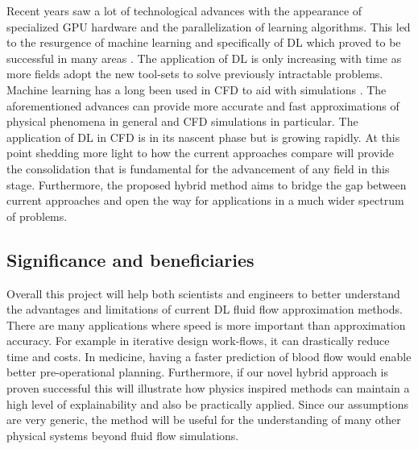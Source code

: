 \documentclass[a4paper,11pt]{article}
\begin{document}
 Recent years saw a lot of technological advances with the appearance of specialized GPU hardware and the parallelization of learning algorithms. This led to the resurgence of machine learning and specifically of DL which proved to be successful in many areas \cite{lecun2015deep}. The application of DL is only increasing with time as more fields adopt the new tool-sets to solve previously intractable problems. Machine learning has a long been used in CFD to aid with simulations \cite{ferziger2012computationalcfd}. The aforementioned advances can provide more accurate and fast approximations of physical phenomena in general and CFD simulations in particular. The application of DL in CFD is in its nascent phase but is growing rapidly. At this point shedding more light to how the current approaches compare will provide the consolidation that is fundamental for the advancement of any field in this stage. Furthermore, the proposed hybrid method aims to bridge the gap between current approaches and open the way for applications in a much wider spectrum of problems.

\subsection{Significance and beneficiaries}


Overall this project will help both scientists and engineers to better understand the advantages and limitations of current DL fluid flow approximation methods. There are many applications where speed is more important than approximation accuracy. For example in iterative design work-flows, it can drastically reduce time and costs. In medicine, having a faster prediction of blood flow would enable better pre-operational planning. Furthermore, if our novel hybrid approach is proven successful this will illustrate how physics inspired methods can maintain a high level of explainability and also be practically applied. Since our assumptions are very generic, the method will be useful for the understanding of many other physical systems beyond fluid flow simulations. 
\end{document}
